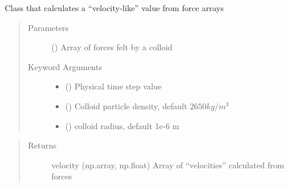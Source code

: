 \documentclass[letterpaper,10pt,english]{sphinxmanual}
\begin{document}
\begin{fulllineitems}
\label{\detokenize{index:lb_colloids.Colloids.Colloid_Math.ForceToVelocity}}
Class that calculates a “velocity-like” value from force arrays
\begin{quote}\begin{description}
\item[{Parameters}] \leavevmode
{} () \textendash{} Array of forces felt by a colloid

\item[{Keyword Arguments}] \leavevmode\begin{itemize}
\item {} 
 () \textendash{} Physical time step value

\item {} 
 () \textendash{} Colloid particle density, default \(2650 kg/m^3\)

\item {} 
 () \textendash{} colloid radius, default 1e-6 m

\end{itemize}

\end{description}\end{quote}
\begin{quote}\begin{description}
\item[{Returns}] \leavevmode
velocity (np.array, np.float) Array of “velocities” calculated from forces

\end{description}\end{quote}

\end{fulllineitems}

\end{document}
